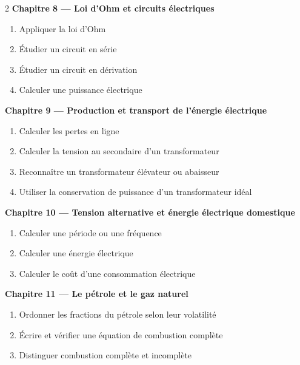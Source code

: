 \begin{multicols}{2}
\textbf{\normalsize\color{onbo}Chapitre 8 --- Loi d'Ohm et circuits électriques}
\begin{enumerate}[label=\arabic*.,itemsep=1pt,topsep=2pt,leftmargin=1.6em]
\item Appliquer la loi d'Ohm
\item Étudier un circuit en série
\item Étudier un circuit en dérivation
\item Calculer une puissance électrique
\end{enumerate}
\vspace{4pt}

\textbf{\normalsize\color{onbo}Chapitre 9 --- Production et transport de l'énergie électrique}
\begin{enumerate}[label=\arabic*.,itemsep=1pt,topsep=2pt,leftmargin=1.6em]
\item Calculer les pertes en ligne
\item Calculer la tension au secondaire d'un transformateur
\item Reconnaître un transformateur élévateur ou abaisseur
\item Utiliser la conservation de puissance d'un transformateur idéal
\end{enumerate}
\vspace{4pt}

\textbf{\normalsize\color{onbo}Chapitre 10 --- Tension alternative et énergie électrique domestique}
\begin{enumerate}[label=\arabic*.,itemsep=1pt,topsep=2pt,leftmargin=1.6em]
\item Calculer une période ou une fréquence
\item Calculer une énergie électrique
\item Calculer le coût d'une consommation électrique
\end{enumerate}
\vspace{4pt}

\textbf{\normalsize\color{onbo}Chapitre 11 --- Le pétrole et le gaz naturel}
\begin{enumerate}[label=\arabic*.,itemsep=1pt,topsep=2pt,leftmargin=1.6em]
\item Ordonner les fractions du pétrole selon leur volatilité
\item Écrire et vérifier une équation de combustion complète
\item Distinguer combustion complète et incomplète
\end{enumerate}
\vspace{4pt}


\end{multicols}
